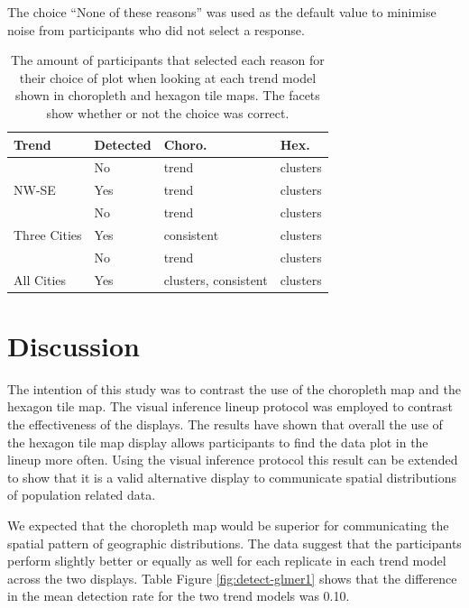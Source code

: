 \documentclass{monashthesis}
\begin{document}
The choice ``None of these reasons'' was used as the default value to minimise noise from participants who did not select a response.

\begin{table}[!h]

\caption{\label{tab:reason}The amount of participants that selected each reason for their choice of plot when looking at each trend model shown in choropleth and hexagon tile maps. The facets show whether or not the choice was correct.}
\centering
\begin{tabular}[t]{llll}
\toprule
Trend & Detected & Choro. & Hex.\\
\midrule
 & No & trend & clusters\\
\cmidrule{2-4}
\multirow{-2}{*}{\raggedright\arraybackslash NW-SE} & Yes & trend & clusters\\
\cmidrule{1-4}
 & No & trend & clusters\\
\cmidrule{2-4}
\multirow{-2}{*}{\raggedright\arraybackslash Three Cities} & Yes & consistent & clusters\\
\cmidrule{1-4}
 & No & trend & clusters\\
\cmidrule{2-4}
\multirow{-2}{*}{\raggedright\arraybackslash All Cities} & Yes & clusters, consistent & clusters\\
\bottomrule
\end{tabular}
\end{table}

\hypertarget{discussion}{%
\section{Discussion}\label{discussion}}

The intention of this study was to contrast the use of the choropleth map and the hexagon tile map. The visual inference lineup protocol was employed to contrast the effectiveness of the displays. The results have shown that overall the use of the hexagon tile map display allows participants to find the data plot in the lineup more often.
Using the visual inference protocol this result can be extended to show that it is a valid alternative display to communicate spatial distributions of population related data.

We expected that the choropleth map would be superior for communicating the spatial pattern of geographic distributions. The data suggest that the participants perform slightly better or equally as well for each replicate in each trend model across the two displays. Table Figure \ref{fig:detect-glmer1} shows that the difference in the mean detection rate for the two trend models was 0.10.
\end{document}
